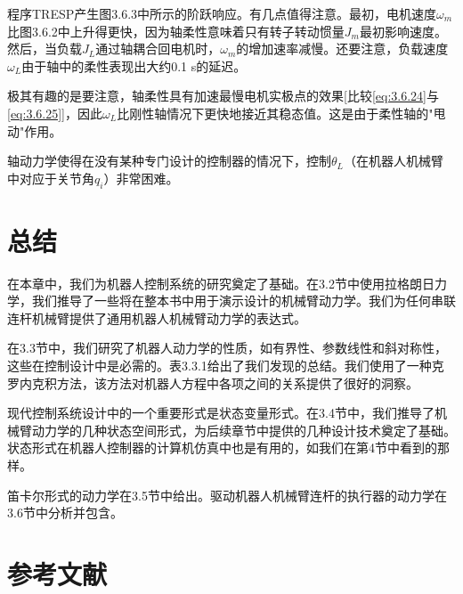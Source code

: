 \documentclass[12pt,a4paper]{ctexart}
\begin{document}
程序TRESP产生图3.6.3中所示的阶跃响应。有几点值得注意。最初，电机速度$\omega_m$比图3.6.2中上升得更快，因为轴柔性意味着只有转子转动惯量$J_m$最初影响速度。然后，当负载$J_L$通过轴耦合回电机时，$\omega_m$的增加速率减慢。还要注意，负载速度$\omega_L$由于轴中的柔性表现出大约0.1 s的延迟。

极其有趣的是要注意，轴柔性具有加速最慢电机实极点的效果[比较\eqref{eq:3.6.24}与\eqref{eq:3.6.25}]，因此$\omega_L$比刚性轴情况下更快地接近其稳态值。这是由于柔性轴的"甩动"作用。

轴动力学使得在没有某种专门设计的控制器的情况下，控制$\theta_L$（在机器人机械臂中对应于关节角$q_i$）非常困难。

\section{总结}

在本章中，我们为机器人控制系统的研究奠定了基础。在3.2节中使用拉格朗日力学，我们推导了一些将在整本书中用于演示设计的机械臂动力学。我们为任何串联连杆机械臂提供了通用机器人机械臂动力学的表达式。

在3.3节中，我们研究了机器人动力学的性质，如有界性、参数线性和斜对称性，这些在控制设计中是必需的。表3.3.1给出了我们发现的总结。我们使用了一种克罗内克积方法，该方法对机器人方程中各项之间的关系提供了很好的洞察。

现代控制系统设计中的一个重要形式是状态变量形式。在3.4节中，我们推导了机械臂动力学的几种状态空间形式，为后续章节中提供的几种设计技术奠定了基础。状态形式在机器人控制器的计算机仿真中也是有用的，如我们在第4节中看到的那样。

笛卡尔形式的动力学在3.5节中给出。驱动机器人机械臂连杆的执行器的动力学在3.6节中分析并包含。

\section{参考文献}
\end{document}
